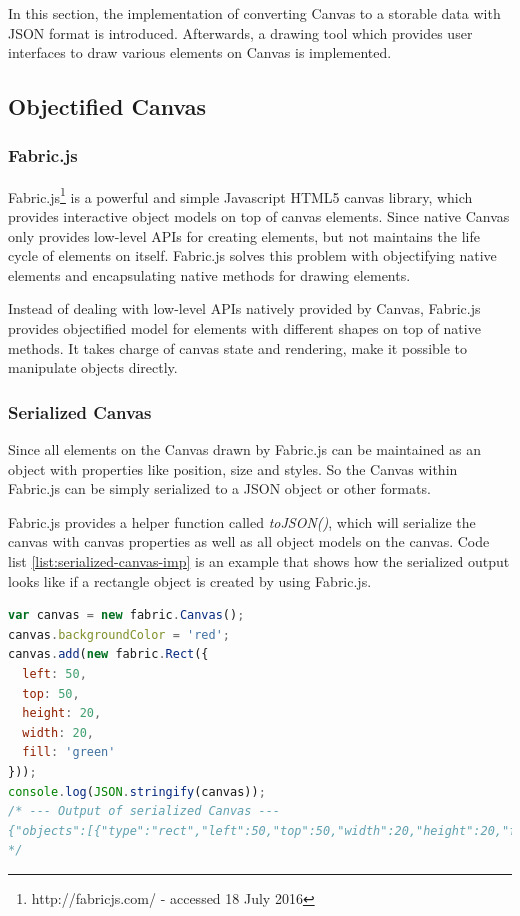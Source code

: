 In this section, the implementation of converting Canvas to a storable data with JSON format is introduced. Afterwards, a drawing tool which provides user interfaces to draw various elements on Canvas is implemented.

\subsection{Objectified Canvas}

\subsubsection{Fabric.js}
Fabric.js\footnote{http://fabricjs.com/ - accessed 18 July 2016} is a powerful and simple Javascript HTML5 canvas library, which provides interactive object models on top of canvas elements. Since native Canvas only provides low-level APIs for creating elements, but not maintains the life cycle of elements on itself. Fabric.js solves this problem with objectifying native elements and encapsulating native methods for drawing elements. 

Instead of dealing with low-level APIs natively provided by Canvas, Fabric.js provides objectified model for elements with different shapes  on top of native methods. It takes charge of canvas state and rendering, make it possible to manipulate objects directly.


\subsubsection{Serialized Canvas}
Since all elements on the Canvas drawn by Fabric.js can be maintained as an object with properties like position, size and styles.
So the Canvas within Fabric.js can be simply serialized to a JSON object or other formats. 

Fabric.js provides a helper function called \textit{toJSON()}, which will serialize the canvas with canvas properties as well as all object models on the canvas. Code list \ref{list:serialized-canvas-imp} is an example that shows how the serialized output looks like if a rectangle object is created by using Fabric.js.

\begin{lstlisting}[language=JavaScript, caption=Serialized Canvas by Fabric.js , label={list:serialized-canvas-imp}]
var canvas = new fabric.Canvas();
canvas.backgroundColor = 'red';
canvas.add(new fabric.Rect({
  left: 50,
  top: 50,
  height: 20,
  width: 20,
  fill: 'green'
}));
console.log(JSON.stringify(canvas));
/* --- Output of serialized Canvas --- 
{"objects":[{"type":"rect","left":50,"top":50,"width":20,"height":20,"fill":"green","overlayFill":null,"stroke":null,"strokeWidth":1,"strokeDashArray":null,"scaleX":1,"scaleY":1,"angle":0,"flipX":false,"flipY":false,"opacity":1,"selectable":true,"hasControls":true,"hasBorders":true,"hasRotatingPoint":false,"transparentCorners":true,"perPixelTargetFind":false,"rx":0,"ry":0}],"background":"rgba(0, 0, 0, 0)"}
*/
\end{lstlisting}

